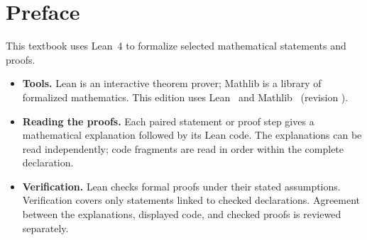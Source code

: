 \chapter{Preface}



This textbook uses Lean~4 to formalize selected mathematical statements and proofs.

\begin{itemize}
  \item \textbf{Tools.}
        Lean is an interactive theorem prover; Mathlib is a library of formalized mathematics.
        This edition uses Lean~\TextbookLeanVersion{} and Mathlib~\TextbookMathlibVersion{}
        (revision
        \href{https://github.com/leanprover-community/mathlib4/commit/\TextbookMathlibRevision}{\texttt{\TextbookMathlibShortRevision}}).
  \item \textbf{Reading the proofs.}
        Each paired statement or proof step gives a mathematical explanation followed by its Lean
        code.
        The explanations can be read independently; code fragments are read in order within the
        complete declaration.
  \item \textbf{Verification.}
        Lean checks formal proofs under their stated assumptions.
        Verification covers only statements linked to checked declarations.
        Agreement between the explanations, displayed code, and checked proofs is reviewed
        separately.
\end{itemize}
